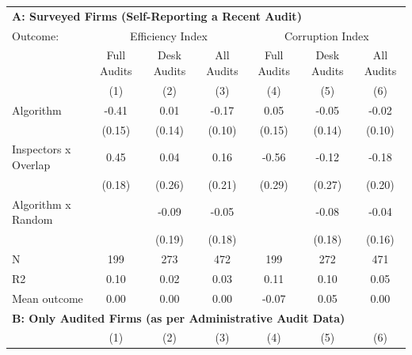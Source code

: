\begin{tabular}{lccc|ccc} \toprule
\multicolumn{7}{l}{\textbf{A: Surveyed Firms (Self-Reporting a Recent Audit)}} \\ \multicolumn{1}{l}{Outcome:} & \multicolumn{3}{c}{Efficiency Index} & \multicolumn{3}{c}{Corruption Index} \\ \multicolumn{1}{l}{} & Full Audits & Desk Audits & All Audits & Full Audits & Desk Audits & All Audits \\ \multicolumn{1}{l}{} & (1) & (2) & (3) & (4) & (5) & (6) \\ \midrule
Algorithm   &       -0.41\sym{***}&        0.01         &       -0.17         &        0.05         &       -0.05         &       -0.02         \\
            &      (0.15)         &      (0.14)         &      (0.10)         &      (0.15)         &      (0.14)         &      (0.10)         \\
\addlinespace
Inspectors x Overlap&        0.45\sym{**} &        0.04         &        0.16         &       -0.56\sym{*}  &       -0.12         &       -0.18         \\
            &      (0.18)         &      (0.26)         &      (0.21)         &      (0.29)         &      (0.27)         &      (0.20)         \\
\addlinespace
Algorithm x Random&                     &       -0.09         &       -0.05         &                     &       -0.08         &       -0.04         \\
            &                     &      (0.19)         &      (0.18)         &                     &      (0.18)         &      (0.16)         \\
\midrule
N           &         199         &         273         &         472         &         199         &         272         &         471         \\
R2          &        0.10         &        0.02         &        0.03         &        0.11         &        0.10         &        0.05         \\
Mean outcome&        0.00         &        0.00         &        0.00         &       -0.07         &        0.05         &        0.00         \\

\midrule \multicolumn{7}{l}{\textbf{B: Only Audited Firms (as per Administrative Audit Data)}} \\ \multicolumn{1}{l}{} & (1) & (2) & (3) & (4) & (5) & (6) \\ \midrule


\end{tabular}
